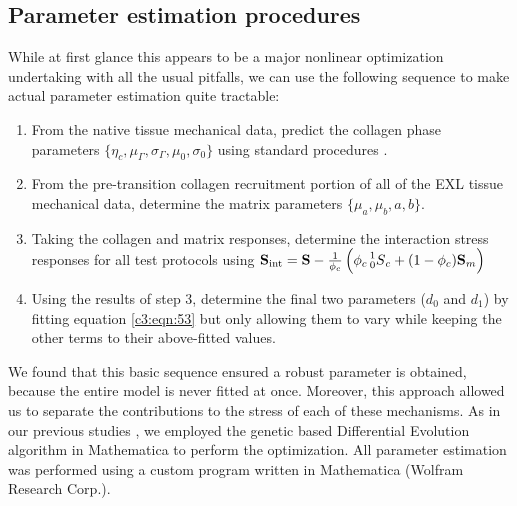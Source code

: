         
        
        
\subsection{Parameter estimation procedures}

    While at first glance this appears to be a major nonlinear optimization undertaking with all the usual pitfalls, we can use the following sequence to make actual parameter estimation quite tractable:
        \begin{enumerate}
            \item From the native tissue mechanical data, predict the collagen phase parameters $\{\eta_c, \mu_\Gamma, \sigma_\Gamma, \mu_0, \sigma_0\}$ using standard procedures \cite{fata_insights_2014,zhang_meso_2016}.
            \item From the pre-transition collagen recruitment portion of all of the EXL tissue mechanical data, determine the matrix parameters $\{\mu_a, \mu_b, a, b\}$.
            \item Taking the collagen and matrix responses, determine the interaction stress responses for all test protocols using $\mathbf{S}_\mathrm{int} = \mathbf{S} - \frac{1}{\phi_c}\left(\phi_c \prescript{1}{0}{S}_c + (1-\phi_c)\mathbf{S}_m\right)$
            \item Using the results of step 3, determine the final two parameters ($d_0$ and $d_1$) by fitting equation \ref{c3:eqn:53} but only allowing them to vary while keeping the other terms to their above-fitted values.
        \end{enumerate}
    We found that this basic sequence ensured a robust parameter is obtained, because the entire model is never fitted at once. Moreover, this approach allowed us to separate the contributions to the stress of each of these mechanisms. As in our previous studies \cite{fata_insights_2014,zhang_meso_2016}, we employed the genetic based Differential Evolution algorithm in Mathematica to perform the optimization. All parameter estimation was performed using a custom program written in Mathematica (Wolfram Research Corp.).

        
        